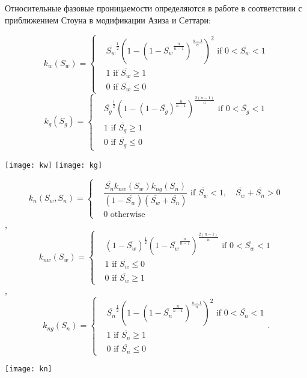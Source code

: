 Относительные фазовые проницаемости определяются в работе в соответствии с
приближением Стоуна в модификации Азиза и Сеттари:

\begin{equation*}
  k_{w}(S_w)=
  \begin{cases}
  &\overline{S_w}^\frac{1}{2} \left( 1-\left( 1-\overline{S_w}^\frac{n}{n-1} \right) ^\frac{n-1}{n} \right) ^2
  \text{ if $0<\overline{S_w}<1$}\\
  &1 \text{ if $\overline{S_w}\ge 1$}\\
  &0 \text{ if $\overline{S_w}\le 0$}
\end{cases} 
\end{equation*}
\begin{equation*}
  k_{g}(S_g)=
  \begin{cases}
  &\overline{S_g}^\frac{1}{2} \left( 1-\left ( 1-\overline{S_g} \right) ^\frac{n}{n-1} \right) ^\frac{2(n-1)}{n}
  \text{ if $0<\overline{S_g}<1$}\\
  &1 \text{ if $\overline{S_g}\ge 1$}\\
  &0 \text{ if $\overline{S_g}\le 0$}
  \end{cases} 
\end{equation*}
\begin{center}
 \texttt{[image: kw]}
 \texttt{[image: kg]}
\end{center}
\begin{equation*}
  k_{n}(S_w,S_n)=
  \begin{cases}
  &\dfrac{\overline{S_n} k_{nw}(S_w)k_{ng}(S_n)}{(1-\overline{S_w})(\overline{S_w}+\overline{S_n})}
  \text{ if $\overline{S_w}<1, \quad \overline{S_w}+\overline{S_n} >0$}\\
  &0 \text{ otherwise}
  \end{cases}  
\end{equation*}
, \\
\begin{equation*}
  k_{nw}(S_w)=
  \begin{cases}
  &(1-\overline{S_w})^\frac{1}{2} \left(1-\overline{S_w}^\frac{n}{n-1} \right) ^\frac{2(n-1)}{n}
  \text{ if $0<\overline{S_w}<1$}\\
  &1 \text{ if $\overline{S_w}\le 0$}\\
  &0 \text{ if $\overline{S_w}\ge 1$}
  \end{cases}
\end{equation*}
, \\
\begin{equation*}
  k_{ng}(S_n)=
  \begin{cases}
  &\overline{S_n}^\frac{1}{2} \left( 1-\left( 1-\overline{S_n}^\frac{n}{n-1} \right) ^\frac{n-1}{n} \right) ^2 
  \text{ if $0<\overline{S_n}<1$}\\
  &1 \text{ if $\overline{S_n}\ge 1$}\\
  &0 \text{ if $\overline{S_n}\le 0$}
\end{cases}\text{.} 
\end{equation*}
\begin{center}
 \texttt{[image: kn]}
\end{center}
 
